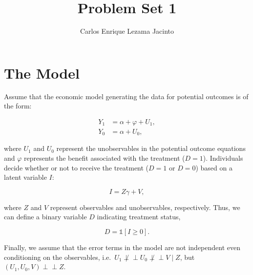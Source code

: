 \documentclass[9pt,twocolumn,twoside,]{pnas-new}
\title{Problem Set 1}
\author[]{Carlos Enrique Lezama Jacinto}
\affil[]{Instituto Tecnológico Autónomo de México}
\begin{document}
\verticaladjustment{-2pt}



\maketitle
\thispagestyle{firststyle}


\acknow{}

\newcommand{\ind}{\perp\!\!\!\!\perp}

\hypertarget{the-model}{%
\section*{The Model}\label{the-model}}

Assume that the economic model generating the data for potential
outcomes is of the form:

\begin{align*}
Y_1 &= \alpha + \varphi + U_1, \\
Y_0 &= \alpha + U_0,
\end{align*}

where \(U_1\) and \(U_0\) represent the unobservables in the potential
outcome equations and \(\varphi\) represents the benefit associated with
the treatment (\(D = 1\)). Individuals decide whether or not to receive
the treatment (\(D = 1\) or \(D = 0\)) based on a latent variable \(I\):

\[
I = Z \gamma + V,
\]

where \(Z\) and \(V\) represent observables and unobservables,
respectively. Thus, we can define a binary variable \(D\) indicating
treatment status,

\[
D = \mathds{1}\left[ I \geq 0\right].
\]

Finally, we assume that the error terms in the model are not independent
even conditioning on the observables,
i.e.~\(U_1 \not\perp\!\!\!\!\perp U_0 \not\perp\!\!\!\!\perp V \mid Z\),
but \((U_1, U_0, V) \perp\!\!\!\!\perp Z\).
\end{document}
